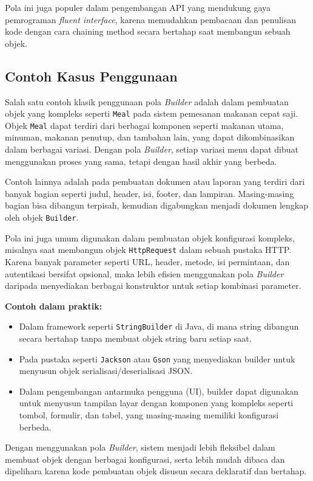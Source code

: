 Pola ini juga populer dalam pengembangan API yang mendukung gaya pemrograman \textit{fluent interface}, karena memudahkan pembacaan dan penulisan kode dengan cara chaining method secara bertahap saat membangun sebuah objek.

\subsection{Contoh Kasus Penggunaan}

Salah satu contoh klasik penggunaan pola \textit{Builder} adalah dalam pembuatan objek yang kompleks seperti \texttt{Meal} pada sistem pemesanan makanan cepat saji. Objek \texttt{Meal} dapat terdiri dari berbagai komponen seperti makanan utama, minuman, makanan penutup, dan tambahan lain, yang dapat dikombinasikan dalam berbagai variasi. Dengan pola \textit{Builder}, setiap variasi menu dapat dibuat menggunakan proses yang sama, tetapi dengan hasil akhir yang berbeda.

Contoh lainnya adalah pada pembuatan dokumen atau laporan yang terdiri dari banyak bagian seperti judul, header, isi, footer, dan lampiran. Masing-masing bagian bisa dibangun terpisah, kemudian digabungkan menjadi dokumen lengkap oleh objek \texttt{Builder}.

Pola ini juga umum digunakan dalam pembuatan objek konfigurasi kompleks, misalnya saat membangun objek \texttt{HttpRequest} dalam sebuah pustaka HTTP. Karena banyak parameter seperti URL, header, metode, isi permintaan, dan autentikasi bersifat opsional, maka lebih efisien menggunakan pola \textit{Builder} daripada menyediakan berbagai konstruktor untuk setiap kombinasi parameter.

\textbf{Contoh dalam praktik:}
\begin{itemize}
\item Dalam framework seperti \texttt{StringBuilder} di Java, di mana string dibangun secara bertahap tanpa membuat objek string baru setiap saat.
\item Pada pustaka seperti \texttt{Jackson} atau \texttt{Gson} yang menyediakan builder untuk menyusun objek serialisasi/deserialisasi JSON.
\item Dalam pengembangan antarmuka pengguna (UI), builder dapat digunakan untuk menyusun tampilan layar dengan komponen yang kompleks seperti tombol, formulir, dan tabel, yang masing-masing memiliki konfigurasi berbeda.
\end{itemize}

Dengan menggunakan pola \textit{Builder}, sistem menjadi lebih fleksibel dalam membuat objek dengan berbagai konfigurasi, serta lebih mudah dibaca dan dipelihara karena kode pembuatan objek disusun secara deklaratif dan bertahap.



